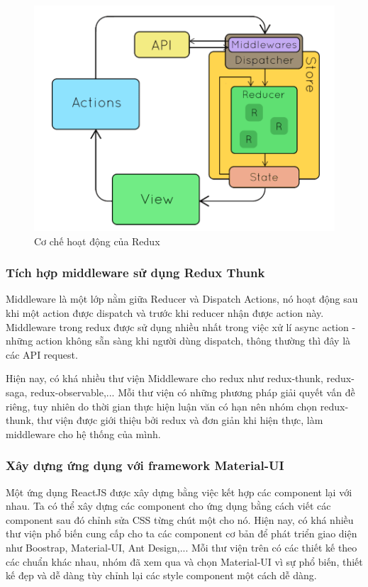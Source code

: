 \begin{figure}[H]
    \begin{center}
        \includegraphics[width=12cm]{Image/Technical/redux-flow.png}
        \caption{Cơ chế hoạt động của Redux}
        \label{redux-flow}
    \end{center}
\end{figure}

\subsubsection{Tích hợp middleware sử dụng Redux Thunk}

Middleware là một lớp nằm giữa Reducer và Dispatch Actions, nó hoạt động sau khi một action được dispatch và trước khi reducer nhận được action này. Middleware trong redux được sử dụng nhiều nhất trong việc xử lí async action - những action không sẵn sàng khi người dùng dispatch, thông thường thì đây là các API request.\par

Hiện nay, có khá nhiều thư viện Middleware cho redux như redux-thunk, redux-saga, redux-observable,... Mỗi thư viện có những phương pháp giải quyết vấn đề riêng, tuy nhiên do thời gian thực hiện luận văn có hạn nên nhóm chọn redux-thunk, thư viện được giới thiệu bởi redux và đơn giản khi hiện thực, làm middleware cho hệ thống của mình.

\subsubsection{Xây dựng ứng dụng với framework Material-UI}

Một ứng dụng ReactJS được xây dựng bằng việc kết hợp các component lại với nhau. Ta có thể xây dựng các component cho ứng dụng bằng cách viết các component sau đó chỉnh sửa CSS từng chút một cho nó. Hiện nay, có khá nhiều thư viện phổ biến cung cấp cho ta các component cơ bản để phát triển giao diện như Boostrap, Material-UI, Ant Design,... Mỗi thư viện trên có các thiết kế theo các chuẩn khác nhau, nhóm đã xem qua và chọn Material-UI vì sự phổ biến, thiết kế đẹp và dễ dàng tùy chỉnh lại các style component một cách dễ dàng.\par

